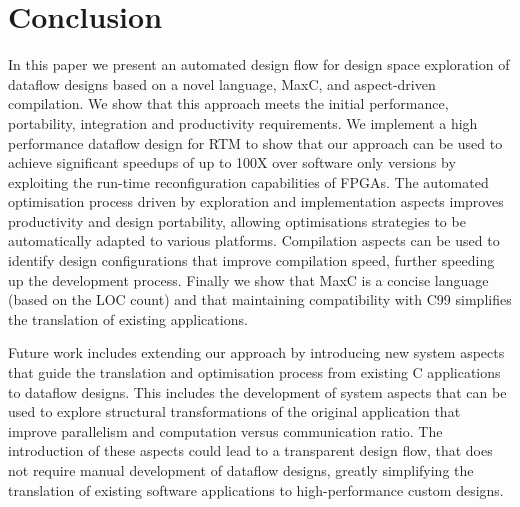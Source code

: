 \section{Conclusion}

In this paper we present an automated design flow for design space
exploration of dataflow designs based on a novel language, MaxC, and
aspect-driven compilation. We show that this approach meets the
initial performance, portability, integration and productivity
requirements. We implement a high performance dataflow design for RTM
to show that our approach can be used to achieve significant speedups
of up to 100X over software only versions by exploiting the run-time
reconfiguration capabilities of FPGAs. The automated optimisation
process driven by exploration and implementation aspects improves
productivity and design portability, allowing optimisations strategies
to be automatically adapted to various platforms. Compilation aspects
can be used to identify design configurations that improve compilation
speed, further speeding up the development process. Finally we show
that MaxC is a concise language (based on the LOC count) and that
maintaining compatibility with C99 simplifies the translation of
existing applications.

Future work includes extending our approach by introducing new system
aspects that guide the translation and optimisation process from
existing C applications to dataflow designs. This includes the
development of system aspects that can be used to explore structural
transformations of the original application that improve parallelism
and computation versus communication ratio. The introduction of these
aspects could lead to a transparent design flow, that does not require
manual development of dataflow designs, greatly simplifying the
translation of existing software applications to high-performance
custom designs.
